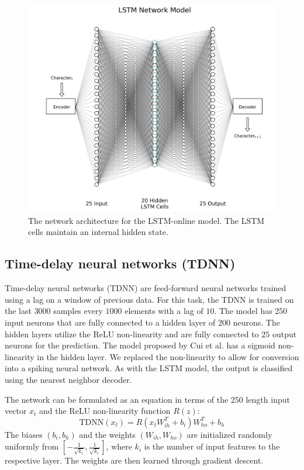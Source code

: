 \documentclass{article}
\begin{document}
\begin{figure}[H]
    \centering
    \includegraphics[width=0.9\linewidth]{../diagrams/lstm.png}
    \caption{The network architecture for the LSTM-online model. The LSTM cells maintain an internal hidden state.}
    \label{fig:lstm-online-model}
\end{figure}

\subsection*{Time-delay neural networks (TDNN)}

Time-delay neural networks (TDNN) are feed-forward neural networks trained using a lag on a window of previous data. \cite{waibel1995phoneme} For this task, the TDNN is trained on the last $3000$ samples every $1000$ elements with a lag of $10$. \cite{rojas1996backpropagation} The model has $250$ input neurons that are fully connected to a hidden layer of $200$ neurons. The hidden layers utilize the ReLU non-linearity and are fully connected to $25$ output neurons for the prediction. The model proposed by Cui et al. has a sigmoid non-linearity in the hidden layer. We replaced the non-linearity to allow for conversion into a spiking neural network. As with the LSTM model, the output is classified using the nearest neighbor decoder.

The network can be formulated as an equation in terms of the 250 length input vector $x_t$ and the ReLU non-linearity function $R(z)$:
\begin{equation}
    \text{TDNN}(x_t) = R\left(x_tW_{ih}^T + b_i\right)W_{ho}^T + b_h
    \label{eq:tdnn}
\end{equation}
The biases $\left(b_i, b_h\right)$ and the weights $\left(W_{ih}, W_{ho}\right)$ are initialized randomly uniformly from $\left[-\frac{1}{\sqrt{k_i}}, \frac{1}{\sqrt{k_i}}\right]$, where $k_i$ is the number of input features to the respective layer. The weights are then learned through gradient descent.
\end{document}
